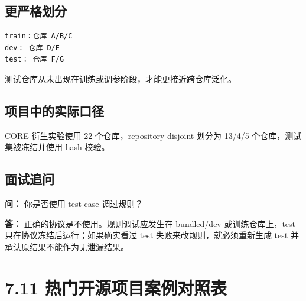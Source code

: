 \documentclass[UTF8,12pt,openany]{ctexbook}
\begin{document}
\subsection{更严格划分}

\begin{lstlisting}
train：仓库 A/B/C
dev： 仓库 D/E
test： 仓库 F/G
\end{lstlisting}

测试仓库从未出现在训练或调参阶段，才能更接近跨仓库泛化。\par

\subsection{项目中的实际口径}

CORE 衍生实验使用 22 个仓库，repository-disjoint 划分为 13/4/5 个仓库，测试集被冻结并使用 hash 校验。\par

\subsection{面试追问}

\textbf{问：} 你是否使用 test case 调过规则？\par

\textbf{答：} 正确的协议是不使用。规则调试应发生在 bundled/dev 或训练仓库上，test 只在协议冻结后运行；如果确实看过 test 失败来改规则，就必须重新生成 test 并承认原结果不能作为无泄漏结果。\par

\section{7.11 热门开源项目案例对照表}
\end{document}
